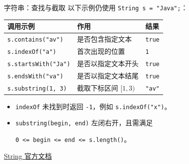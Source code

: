 \documentclass[aspectratio=169]{beamer}
\begin{document}
\begin{frame}[fragile]{字符串：查找与截取}
  以下示例仍使用 \texttt{String s = "Java";}：
  \begin{center}
    \renewcommand{\arraystretch}{1.25}
    \begin{tabular}{lll}
      \textbf{调用示例} & \textbf{作用} & \textbf{结果} \\
      \hline
      \texttt{s.contains("av")} & 是否包含指定文本 & \texttt{true} \\
      \texttt{s.indexOf("a")} & 首次出现的位置 & \texttt{1} \\
      \texttt{s.startsWith("Ja")} & 是否以指定文本开头 & \texttt{true} \\
      \texttt{s.endsWith("va")} & 是否以指定文本结尾 & \texttt{true} \\
      \texttt{s.substring(1, 3)} & 截取下标区间 $[1,3)$ & \texttt{"av"} \\
    \end{tabular}
  \end{center}
  \medskip
  \begin{itemize}
    \item \texttt{indexOf} 未找到时返回 \texttt{-1}，例如 \texttt{s.indexOf("x")}。
    \item \texttt{substring(begin, end)} 左闭右开，且需满足\par
      \texttt{0 <= begin <= end <= s.length()}。
  \end{itemize}
  \medskip
  {\footnotesize\href{https://docs.oracle.com/en/java/javase/25/docs/api/java.base/java/lang/String.html}{String 官方文档}}
\end{frame}
\end{document}
